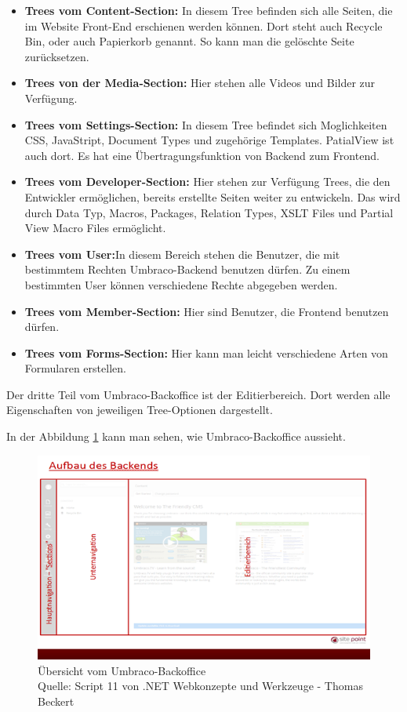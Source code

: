 \begin{itemize}	
	\item\textbf{Trees vom Content-Section:} In diesem Tree befinden sich alle Seiten, die im Website Front-End erschienen werden können. Dort steht auch Recycle Bin, oder auch Papierkorb genannt. So kann man die gelöschte Seite zurücksetzen. 
	\item\textbf{Trees von der Media-Section:} Hier stehen alle Videos und Bilder zur Verfügung.
	\item\textbf{Trees vom Settings-Section:} In diesem Tree befindet sich Moglichkeiten CSS, JavaStript, Document Types und zugehörige Templates. PatialView ist auch dort. Es hat eine Übertragungsfunktion von Backend zum Frontend.
	\item\textbf{Trees vom Developer-Section:} Hier stehen zur Verfügung Trees, die den Entwickler ermöglichen, bereits erstellte Seiten weiter zu entwickeln. Das wird durch Data Typ, Macros, Packages, Relation Types, XSLT Files und Partial View Macro Files ermöglicht.
	\item\textbf{Trees vom User:}In diesem Bereich stehen die Benutzer, die mit bestimmtem Rechten Umbraco-Backend benutzen dürfen. Zu einem bestimmten User können verschiedene Rechte abgegeben werden. 
	\item\textbf{Trees vom Member-Section:} Hier sind Benutzer, die Frontend benutzen dürfen.
	\item\textbf{Trees vom Forms-Section: } Hier kann man leicht verschiedene Arten von Formularen erstellen.		
\end{itemize}

Der dritte Teil vom Umbraco-Backoffice ist der Editierbereich. Dort werden alle Eigenschaften von jeweiligen Tree-Optionen dargestellt.

In der Abbildung \ref{fig:Umbraco Backoffice} kann man sehen, wie Umbraco-Backoffice aussieht.
\begin{figure}[h]
	\centering
	\includegraphics[width=1\linewidth]{Graphics/UmbracoBackend.png}
	\caption[Umbraco Backoffice]{Übersicht vom Umbraco-Backoffice\\Quelle: Script 11 von .NET Webkonzepte und Werkzeuge - Thomas Beckert}
	\label{fig:Umbraco Backoffice}
\end{figure}

